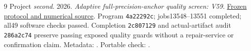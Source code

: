 \documentclass[10pt,twocolumn,letterpaper]{article}
\begin{document}
\begin{thebibliography}{9}
Project \emph{second}. 2026. \emph{Adaptive full-precision-anchor quality screen: V59}.
\href{https://github.com/priyankjairaj100/second/blob/60a514098511526924cb5746a2a61851b5f6bd23/research_v59/PROTOCOL.txt}{Frozen protocol and numerical source}.
Program \texttt{4a22292c}; jobs13548--13551 completed; all49 software checks passed.
Completion \texttt{2c807129} and actual-artifact audit \texttt{286a2c74} preserve
passing exposed quality guards without a repair-service or confirmation claim.
Metadata: .
Portable check: .

\end{thebibliography}
\end{document}
